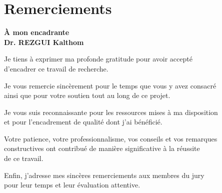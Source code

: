 \chapter*{\textbf{Remerciements}}
\mtcaddchapter
\thispagestyle{plain}
\singlespacing

\vspace*{1.2cm}

\begin{center}
\textbf{ À mon encadrante}\\[0.35cm]
\textbf{Dr. REZGUI Kalthom}
\end{center}

\vspace{1.4cm}

\begin{center}
Je tiens à exprimer ma profonde gratitude pour avoir accepté\\
d'encadrer ce travail de recherche.
\end{center}

\vspace{0.85cm}

\begin{center}
Je vous remercie sincèrement pour le temps que vous y avez consacré\\
ainsi que pour votre soutien tout au long de ce projet.
\end{center}

\vspace{0.85cm}

\begin{center}
Je vous suis reconnaissante pour les ressources mises à ma disposition\\
et pour l'encadrement de qualité dont j'ai bénéficié.
\end{center}

\vspace{0.85cm}

\begin{center}
Votre patience, votre professionnalisme, vos conseils et vos remarques\\
constructives ont contribué de manière significative à la réussite\\
de ce travail.
\end{center}

\vspace{0.85cm}

\begin{center}
Enfin, j'adresse mes sincères remerciements aux membres du jury\\
pour leur temps et leur évaluation attentive.
\end{center}

\onehalfspacing
